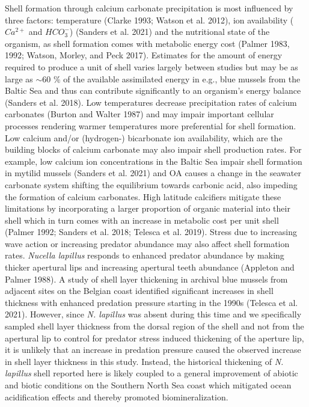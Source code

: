 \documentclass[smallextended]{svjour3}       %
\begin{document}
Shell formation through calcium carbonate precipitation is most
influenced by three factors: temperature (Clarke 1993; Watson et al.
2012), ion availability (\(Ca^{2+}\) and \(HCO_3^-\)) (Sanders et al.
2021) and the nutritional state of the organism, as shell formation
comes with metabolic energy cost (Palmer 1983, 1992; Watson, Morley, and
Peck 2017). Estimates for the amount of energy required to produce a
unit of shell varies largely between studies but may be as large as
\(\sim60\) \% of the available assimilated energy in e.g., blue mussels
from the Baltic Sea and thus can contribute significantly to an
organism's energy balance (Sanders et al. 2018). Low temperatures
decrease precipitation rates of calcium carbonates (Burton and Walter
1987) and may impair important cellular processes rendering warmer
temperatures more preferential for shell formation. Low calcium and/or
(hydrogen-) bicarbonate ion availability, which are the building blocks
of calcium carbonate may also impair shell production rates. For
example, low calcium ion concentrations in the Baltic Sea impair shell
formation in mytilid mussels (Sanders et al. 2021) and OA causes a
change in the seawater carbonate system shifting the equilibrium towards
carbonic acid, also impeding the formation of calcium carbonates. High
latitude calcifiers mitigate these limitations by incorporating a larger
proportion of organic material into their shell which in turn comes with
an increase in metabolic cost per unit shell (Palmer 1992; Sanders et
al. 2018; Telesca et al. 2019). Stress due to increasing wave action or
increasing predator abundance may also affect shell formation rates.
\emph{Nucella lapillus} responds to enhanced predator abundance by
making thicker apertural lips and increasing apertural teeth abundance
(Appleton and Palmer 1988). A study of shell layer thickening in
archival blue mussels from adjacent sites on the Belgian coast
identified significant increases in shell thickness with enhanced
predation pressure starting in the 1990s (Telesca et al. 2021). However,
since \emph{N. lapillus} was absent during this time and we specifically
sampled shell layer thickness from the dorsal region of the shell and
not from the apertural lip to control for predator stress induced
thickening of the aperture lip, it is unlikely that an increase in
predation pressure caused the observed increase in shell layer thickness
in this study. Instead, the historical thickening of \emph{N. lapillus}
shell reported here is likely coupled to a general improvement of
abiotic and biotic conditions on the Southern North Sea coast which
mitigated ocean acidification effects and thereby promoted
biomineralization.
\end{document}
